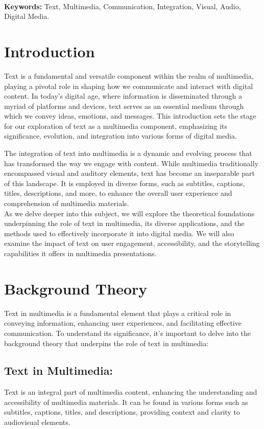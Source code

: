 \documentclass[12pt]{report}
\begin{document}
\textbf{\\Keywords:} Text, Multimedia, Communication, Integration, Visual, Audio, Digital Media.

\newpage
\section*{Introduction}
Text is a fundamental and versatile component within the realm of multimedia, playing a pivotal role in shaping how we communicate and interact with digital content. In today's digital age, where information is disseminated through a myriad of platforms and devices, text serves as an essential medium through which we convey ideas, emotions, and messages. This introduction sets the stage for our exploration of text as a multimedia component, emphasizing its significance, evolution, and integration into various forms of digital media.\cite{text}

The integration of text into multimedia is a dynamic and evolving process that has transformed the way we engage with content. While multimedia traditionally encompassed visual and auditory elements, text has become an inseparable part of this landscape. It is employed in diverse forms, such as subtitles, captions, titles, descriptions, and more, to enhance the overall user experience and comprehension of multimedia materials.\\

As we delve deeper into this subject, we will explore the theoretical foundations underpinning the role of text in multimedia, its diverse applications, and the methods used to effectively incorporate it into digital media. We will also examine the impact of text on user engagement, accessibility, and the storytelling capabilities it offers in multimedia presentations.\cite{multi}



\newpage
\section*{Background Theory}
Text\cite{text} in multimedia is a fundamental element that plays a critical role in conveying information, enhancing user experiences, and facilitating effective communication. To understand its significance, it's important to delve into the background theory that underpins the role of text in multimedia:
\subsection*{Text in Multimedia:} Text is an integral part of multimedia content, enhancing the understanding and accessibility of multimedia materials. It can be found in various forms such as subtitles, captions, titles, and descriptions, providing context and clarity to audiovisual elements.
\end{document}
